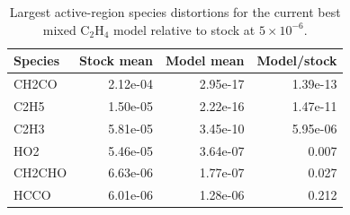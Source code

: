 \begin{table}[t]
\centering
\small
\caption{Largest active-region species distortions for the current best mixed C$_2$H$_4$ model relative to stock at $5\times10^{-6}$.}
\label{tab:c2h4-error-anatomy}
\begin{tabular}{lrrr}
\toprule
Species & Stock mean & Model mean & Model/stock \\
\midrule
CH2CO & 2.12e-04 & 2.95e-17 & 1.39e-13 \\
C2H5 & 1.50e-05 & 2.22e-16 & 1.47e-11 \\
C2H3 & 5.81e-05 & 3.45e-10 & 5.95e-06 \\
HO2 & 5.46e-05 & 3.64e-07 & 0.007 \\
CH2CHO & 6.63e-06 & 1.77e-07 & 0.027 \\
HCCO & 6.01e-06 & 1.28e-06 & 0.212 \\
\bottomrule
\end{tabular}
\end{table}

